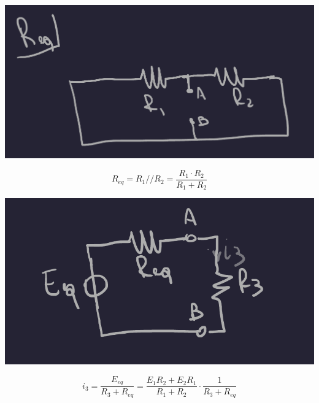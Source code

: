 \documentclass{article}
\begin{document}
\begin{center}
    \includegraphics[scale=0.25]{Image/Esempio_Thevenin_3.png}
\end{center}
\[
    R_{eq} = R_1 // R_2 = \frac{R_1 \cdot R_2}{R_1 + R_2}
\]
\begin{center}
    \includegraphics[scale=0.25]{Image/Esempio_Thevenin_4.png}
\end{center}
\[
    i_3 = \frac{E_{eq}}{R_3+R_{eq}} = \frac{E_1R_2+E_2R_1}{R_1+R_2} \cdot \frac{1}{R_3+R_{eq}}
\]
\end{document}
